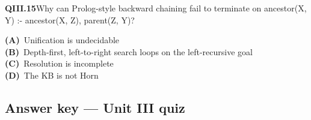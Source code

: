 \begin{tcolorbox}[enhanced,breakable,colback=white,colframe=navyL,arc=2mm,boxrule=0.7pt,left=3mm,right=3mm,top=2mm,bottom=2mm]
\textbf{\color{navy}QIII.15}\quad Why can Prolog-style backward chaining fail to terminate on ancestor(X, Y) :- ancestor(X, Z), parent(Z, Y)?\hfill{}\par\smallskip
{\small \textbf{\color{navyL}(A)}\ Unification is undecidable\\[1pt]\textbf{\color{navyL}(B)}\ Depth-first, left-to-right search loops on the left-recursive goal\\[1pt]\textbf{\color{navyL}(C)}\ Resolution is incomplete\\[1pt]\textbf{\color{navyL}(D)}\ The KB is not Horn}
\end{tcolorbox}
\newpage
\subsection*{Answer key --- Unit III quiz}
